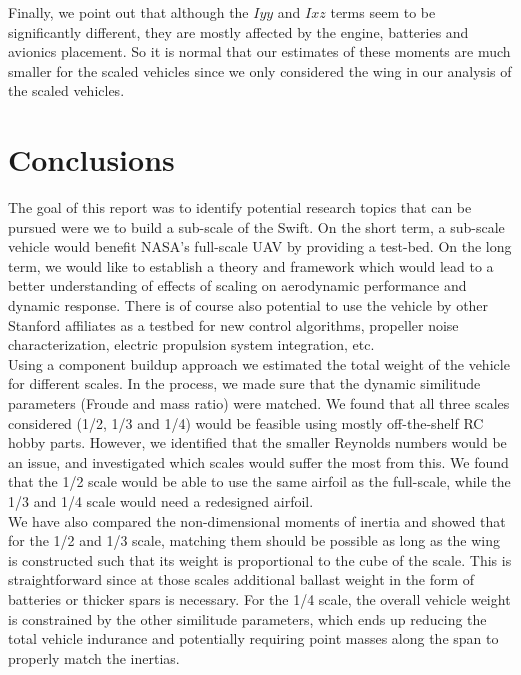 \documentclass[titlepage,10pt]{article}
\begin{document}
Finally, we point out that although the $Iyy$ and $Ixz$ terms seem to be significantly different, they are mostly affected by the engine, batteries and avionics placement. So it is normal that our estimates of these moments are much smaller for the scaled vehicles since we only considered the wing in our analysis of the scaled vehicles.


\newpage
\section{Conclusions}
The goal of this report was to identify potential research topics that can be pursued were we to build a sub-scale of the Swift. On the short term, a sub-scale vehicle would benefit NASA's full-scale UAV by providing a test-bed. On the long term, we would like to establish a theory and framework which would lead to a better understanding of effects of scaling on aerodynamic performance and dynamic response. There is of course also potential to use the vehicle by other Stanford affiliates as a testbed for new control algorithms, propeller noise characterization, electric propulsion system integration, etc. \\

Using a component buildup approach we estimated the total weight of the vehicle for different scales. In the process, we made sure that the dynamic similitude parameters (Froude and mass ratio) were matched. We found that all three scales considered (1/2, 1/3 and 1/4) would be feasible using mostly off-the-shelf RC hobby parts. However, we identified that the smaller Reynolds numbers would be an issue, and investigated which scales would suffer the most from this. We found that the 1/2 scale would be able to use the same airfoil as the full-scale, while the 1/3 and 1/4 scale would need a redesigned airfoil. \\

We have also compared the non-dimensional moments of inertia and showed that for the 1/2 and 1/3 scale, matching them should be possible as long as the wing is constructed such that its weight is proportional to the cube of the scale. This is straightforward since at those scales additional ballast weight in the form of batteries or thicker spars is necessary. For the 1/4 scale, the overall vehicle weight is constrained by the other similitude parameters, which ends up reducing the total vehicle indurance and potentially requiring point masses along the span to properly match the inertias.\\
\end{document}

